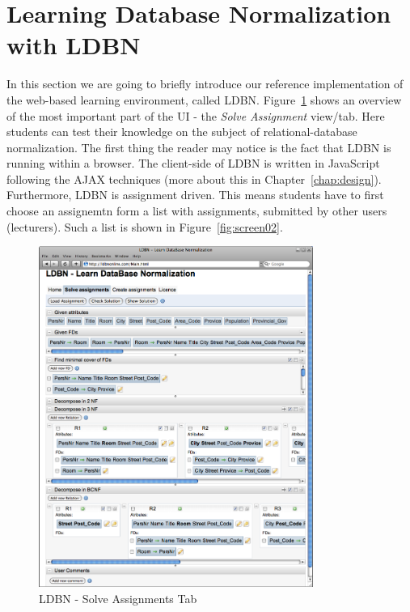 \section{Learning Database Normalization with LDBN}
\label{sec:introldbn}
In this section we are going to briefly introduce our reference implementation
of the web-based learning environment, called LDBN.    
Figure~\ref{fig:screen01} shows an overview of the most important part of the UI - 
the \textit{Solve Assignment} view/tab. Here students can test their knowledge on 
the subject of relational-database normalization. The first thing the reader 
may notice is the fact that LDBN is running within a browser. The client-side 
of LDBN is written in JavaScript following the AJAX techniques 
(more about this in Chapter~\ref{chap:design}). 
Furthermore, LDBN is assignment driven. This means students have to first 
choose an assignemtn 
form a list with assignments, submitted by other users (lecturers). 
Such a list is shown in Figure~\ref{fig:screen02}.

\begin{figure}[h]
	\begin{center}
		\includegraphics[width=0.8\textwidth]{./img/screen01b.png}
		\caption{LDBN - Solve Assignments Tab}
		\label{fig:screen01}
	\end{center}
\end{figure}

